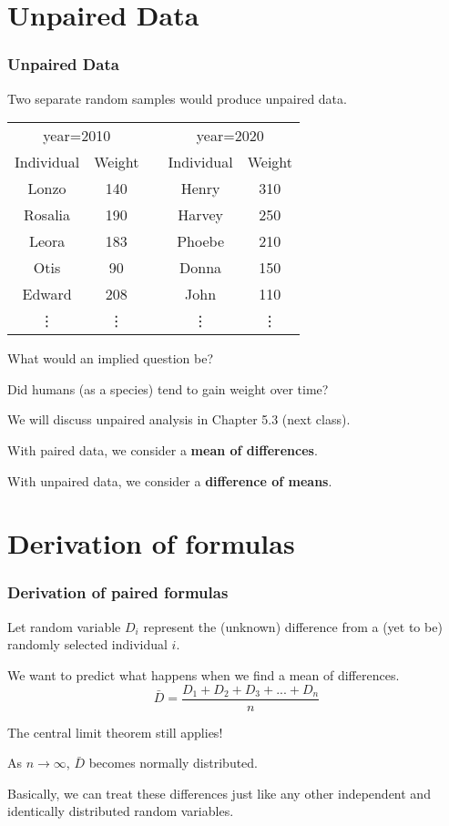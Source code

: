\documentclass[slidestop,compress,mathserif]{beamer}
\newcommand{\soln}[1]{#1}
\begin{document}
\section{Unpaired Data}
\begin{frame}
\frametitle{Unpaired Data}
Two separate random samples would produce unpaired data.
\begin{center}
\begin{tabular}{|c|c|c|c|c|} \cline{1-2} \cline{4-5}
\multicolumn{2}{|c|}{year=2010} && \multicolumn{2}{|c|}{year=2020} \\ 
Individual & Weight && Individual& Weight \\ \cline{1-2} \cline{4-5}
Lonzo   & 140   && Henry & 310\\
Rosalia & 190   && Harvey & 250\\
Leora   & 183   && Phoebe & 210\\
Otis    & 90    && Donna & 150\\
Edward  & 208   && John & 110\\
\vdots&\vdots && \vdots & \vdots \\\cline{1-2} \cline{4-5}
\end{tabular}
\end{center}
What would an implied question be? \pause
\begin{center}
\soln{Did humans (as a species) tend to gain weight over time?}
\vfill
\end{center} \pause
We will discuss unpaired analysis in Chapter 5.3 (next class).

With paired data, we consider a {\bf mean of differences}.

With unpaired data, we consider a {\bf difference of means}.
\end{frame}

\newcommand{\Xd}{X_\text{diff}}
\newcommand{\xd}{x_\text{diff}}

\section{Derivation of formulas}
\begin{frame}
\frametitle{Derivation of paired formulas}
Let random variable $D_i$ represent the (unknown) difference from a (yet to be) randomly selected individual $i$. \pause

We want to predict what happens when we find a mean of differences.
$$\bar{D} = \frac{D_1+D_2+D_3+...+D_n}{n}$$ \pause

The central limit theorem still applies! \pause
\vfill

As $n\to \infty$, $\bar{D}$ becomes normally distributed.\pause
\vfill 

Basically, we can treat these differences just like any other independent and identically distributed random variables. 
\vfill
\end{frame}
\end{document}
